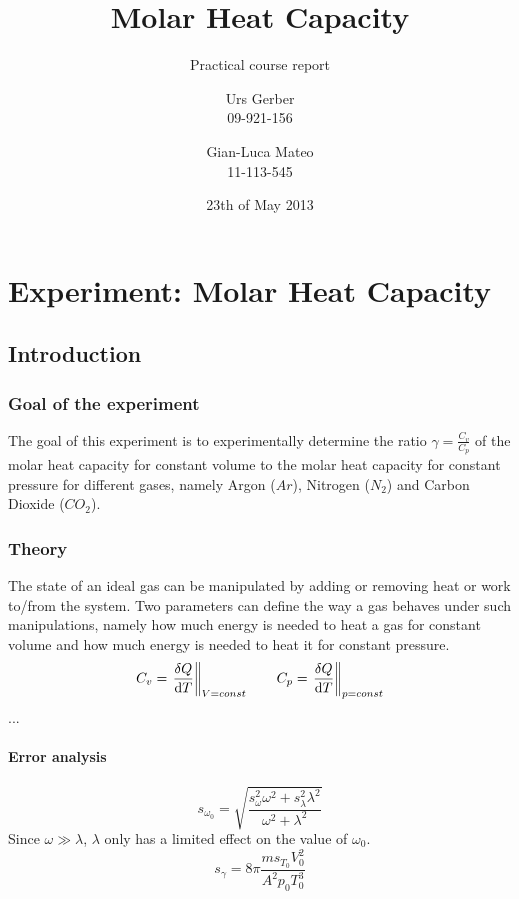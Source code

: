 \documentclass{scrreprt}
\author{Urs Gerber\\09-921-156 \and Gian-Luca Mateo\\11-113-545}
\date{23th of May 2013}
\title{Molar Heat Capacity}
\subtitle{Practical course report}
\begin{document}
\maketitle

\tableofcontents
\newpage

\chapter{Experiment: Molar Heat Capacity}
\section{Introduction}


\subsection{Goal of the experiment}
The goal of this experiment is to experimentally determine the ratio $\gamma = \frac{C_v}{C_p}$ of the molar heat capacity for constant volume to the molar heat capacity for constant pressure for different gases, namely Argon ($Ar$), Nitrogen ($N_2$) and Carbon Dioxide ($CO_2$). 
 
\subsection{Theory} 
The state of an ideal gas can be manipulated by adding or removing heat or work to/from the system. Two parameters can define the way a gas behaves under such manipulations, namely how much energy is needed to heat a gas for constant volume and how much energy is needed to heat it for constant pressure.
\begin{equation}
C_v = \left. \frac{\delta Q}{\dif{T}} \right\|_{V=const}
\qquad C_p = \left. \frac{\delta Q}{\dif{T}} \right\|_{p=const} 
\end{equation}
...
\
\subsubsection{Error analysis}
\begin{equation}
s_{\omega_0} = \sqrt{\frac{s_\omega^2 \omega^2 + s_\lambda^2 \lambda^2}{\omega^2+\lambda^2}}
\end{equation}
Since $\omega \gg \lambda$, $\lambda$ only has a limited effect on the value of $\omega_0$.\\

\begin{equation}
s_\gamma = 8 \pi \frac{m s_{T_0} V_0^2}{A^2 p_0 T_0^3}
\end{equation} 
\end{document}
